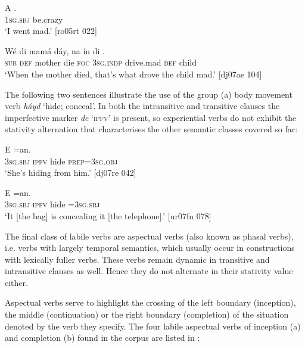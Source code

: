 \ea%
    \label{ex:key:1126}
    \gll \MakeUppercase{A}   .\\
\textsc{1sg.sbj}  be.crazy\\

\glt ‘I went mad.’ [ro05rt 022]
\z


\ea%
    \label{ex:key:1127}
    \gll Wé  di  mamá  dáy,    na  ín        di  .\\
\textsc{sub}  \textsc{def}  mother  die    \textsc{foc}  \textsc{3sg.indp}  drive.mad  \textsc{def}  child\\

\glt ‘When the mother died, that’s what drove the child mad.’ [dj07ae 104]
\z

The following two sentences illustrate the use of the group (a) body movement verb \textit{háyd} ‘hide; conceal’. In both the intransitive  and transitive  clauses the imperfective marker \textit{de} ‘\textsc{ipfv}’ is present, so experiential verbs do not exhibit the stativity alternation that characterises the other semantic classes covered so far: 


\ea%
    \label{ex:key:1128}
    \gll E        =an.\\
\textsc{3sg.sbj}  \textsc{ipfv}  hide    \textsc{prep}=\textsc{3sg.obj}\\

\glt ‘She’s hiding from him.’ [dj07re 042]
\z


\ea%
    \label{ex:key:1129}
    \gll E      =an.\\
\textsc{3sg.sbj}  \textsc{ipfv}  hide  =\textsc{3sg.sbj}\\

\glt ‘It [the bag] is concealing it [the telephone].’ [ur07fn 078]
\z

The final class of labile verbs are aspectual verbs (also known as phasal verbs), i.e. verbs with largely temporal semantics, which usually occur in constructions with lexically fuller verbs. These verbs remain dynamic in transitive and intransitive clauses as well. Hence they do not alternate in their stativity value either. 


Aspectual verbs serve to highlight the crossing of the left boundary (inception), the middle (continuation) or the right boundary (completion) of the situation denoted by the verb they specify. The four labile aspectual verbs of inception (a) and completion (b) found in the corpus are listed in :

